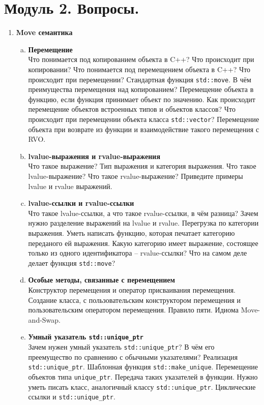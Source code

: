 \documentclass{article}
\begin{document}

\section*{Модуль 2. Вопросы.}
\begin{enumerate}

\item \textbf{Move семантика}
\begin{enumerate}[a.]

\item \textbf{Перемещение}\\
Что понимается под копированием объекта в C++? Что происходит при копировании? Что понимается под перемещением объекта в C++? Что происходит при перемещении? Стандартная функция \texttt{std::move}. В чём преимущества перемещения над копированием? Перемещение объекта в функцию, если функция принимает объект по значению. Как происходит перемещение объектов встроенных типов и объектов классов? Что происходит при перемещении объекта класса \texttt{std::vector}? Перемещение объекта при возврате из функции и взаимодействие такого перемещения с RVO.


\item \textbf{lvalue-выражения и rvalue-выражения}\\
Что такое выражение? Тип выражения и категория выражения. Что такое lvalue-выражение? Что такое rvalue-выражение? Приведите примеры lvalue и rvalue выражений.


\item \textbf{lvalue-ссылки и rvalue-ссылки}\\
Что такое lvalue-ссылки, а что такое rvalue-ссылки, в чём разница? Зачем нужно разделение выражений на lvalue и rvalue. Перегрузка по категории выражения. Уметь написать функцию, которая печатает категорию переданого ей выражения. Какую категорию имеет выражение, состоящее только из одного идентификатора -- rvalue-ссылки? Что на самом деле делает функция \texttt{std::move}?

\item \textbf{Особые методы, связанные с перемещением}\\
Конструктор перемещения и оператор присваивания перемещения. Создание класса, с пользовательским конструктором перемещения и пользовательским оператором перемещения. Правило пяти. Идиома Move-and-Swap.

\item \textbf{Умный указатель \texttt{std::unique\_ptr}}\\
Зачем нужен умный указатель \texttt{std::unique\_ptr}? В чём его преемущество по сравнению с обычными указателями? Реализация \texttt{std::unique\_ptr}. Шаблонная функция \texttt{std::make\_unique}. Перемещение объектов типа \texttt{unique\_ptr}. Передача таких указателей в функции. Нужно уметь писать класс, аналогичный классу \texttt{std::unique\_ptr}. Циклические ссылки и \texttt{std::unique\_ptr}.


\end{enumerate}
\end{enumerate}
\end{document}
